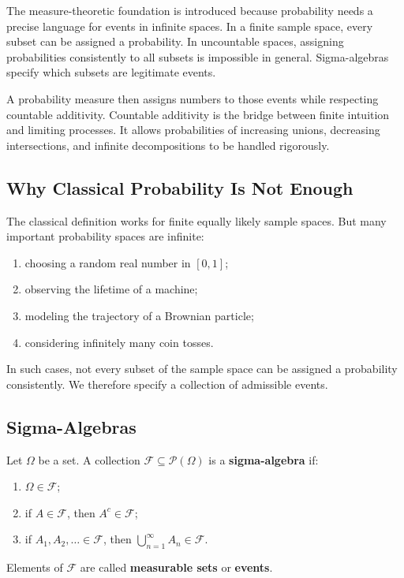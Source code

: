 The measure-theoretic foundation is introduced because probability needs a precise language for events in infinite spaces. In a finite sample space, every subset can be assigned a probability. In uncountable spaces, assigning probabilities consistently to all subsets is impossible in general. Sigma-algebras specify which subsets are legitimate events.

A probability measure then assigns numbers to those events while respecting countable additivity. Countable additivity is the bridge between finite intuition and limiting processes. It allows probabilities of increasing unions, decreasing intersections, and infinite decompositions to be handled rigorously.

\subsection{Why Classical Probability Is Not Enough}

The classical definition works for finite equally likely sample spaces. But many important probability spaces are infinite:
\begin{enumerate}
    \item choosing a random real number in $[0,1]$;
    \item observing the lifetime of a machine;
    \item modeling the trajectory of a Brownian particle;
    \item considering infinitely many coin tosses.
\end{enumerate}

In such cases, not every subset of the sample space can be assigned a probability consistently. We therefore specify a collection of admissible events.

\subsection{Sigma-Algebras}

\begin{definition}
Let $\Omega$ be a set. A collection $\mathcal{F}\subseteq\mathcal{P}(\Omega)$ is a \textbf{sigma-algebra} if:
\begin{enumerate}
    \item $\Omega\in\mathcal{F}$;
    \item if $A\in\mathcal{F}$, then $A^c\in\mathcal{F}$;
    \item if $A_1,A_2,\dots\in\mathcal{F}$, then $\bigcup_{n=1}^{\infty}A_n\in\mathcal{F}$.
\end{enumerate}
Elements of $\mathcal{F}$ are called \textbf{measurable sets} or \textbf{events}.
\end{definition}

